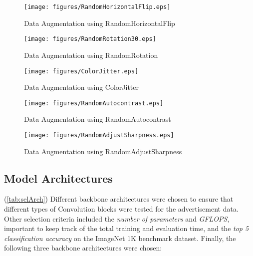 \documentclass[conference]{IEEEtran}
\begin{document}
\begin{figure}[htbp] 
    \texttt{[image: figures/RandomHorizontalFlip.eps]} 
    \caption{Data Augmentation using RandomHorizontalFlip} 
    \label{fig:RandomHorizontalFlip} 
    \end{figure}

\begin{figure}[htbp] 
    \texttt{[image: figures/RandomRotation30.eps]} 
    \caption{Data Augmentation using RandomRotation} 
    \label{fig:RandomRotation30}
    \end{figure}

\begin{figure}[htbp] 
    \texttt{[image: figures/ColorJitter.eps]} 
    \caption{Data Augmentation using ColorJitter} 
    \label{fig:ColorJitter} 
    \end{figure}

\begin{figure}[htbp] 
    \texttt{[image: figures/RandomAutocontrast.eps]} 
    \caption{Data Augmentation using RandomAutocontrast} 
    \label{fig:RandomAutocontrast}
    \end{figure}

\begin{figure}[htbp] 
    \texttt{[image: figures/RandomAdjustSharpness.eps]} 
    \caption{Data Augmentation using RandomAdjustSharpness} 
    \label{fig:RandomAdjustSharpness}
    \end{figure}
    


\subsection{Model Architectures} 
(\ref{tab:selArch}) Different backbone architectures were chosen to ensure that different types of Convolution blocks were tested for the advertisement data. Other selection criteria included the \textit{number of parameters} and \textit{GFLOPS}, important to keep track of the total training and evaluation time, and the \textit{top 5 classification accuracy} on the ImageNet 1K benchmark dataset. Finally, the following three
backbone architectures were chosen:
\end{document}

